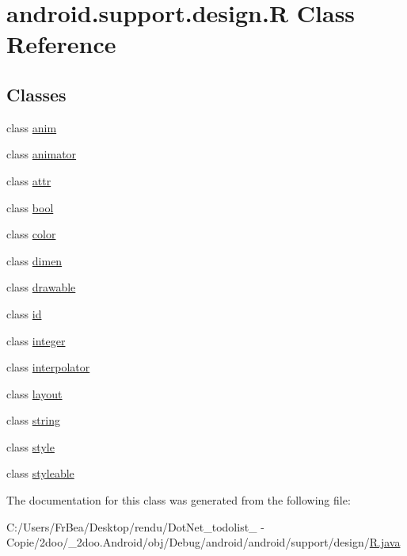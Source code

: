 \hypertarget{classandroid_1_1support_1_1design_1_1_r}{
\section{android.support.design.R Class Reference}
\label{classandroid_1_1support_1_1design_1_1_r}
}
\subsection*{Classes}
\begin{CompactItemize}
\item 
class \hyperlink{classandroid_1_1support_1_1design_1_1_r_1_1anim}{anim}
\item 
class \hyperlink{classandroid_1_1support_1_1design_1_1_r_1_1animator}{animator}
\item 
class \hyperlink{classandroid_1_1support_1_1design_1_1_r_1_1attr}{attr}
\item 
class \hyperlink{classandroid_1_1support_1_1design_1_1_r_1_1bool}{bool}
\item 
class \hyperlink{classandroid_1_1support_1_1design_1_1_r_1_1color}{color}
\item 
class \hyperlink{classandroid_1_1support_1_1design_1_1_r_1_1dimen}{dimen}
\item 
class \hyperlink{classandroid_1_1support_1_1design_1_1_r_1_1drawable}{drawable}
\item 
class \hyperlink{classandroid_1_1support_1_1design_1_1_r_1_1id}{id}
\item 
class \hyperlink{classandroid_1_1support_1_1design_1_1_r_1_1integer}{integer}
\item 
class \hyperlink{classandroid_1_1support_1_1design_1_1_r_1_1interpolator}{interpolator}
\item 
class \hyperlink{classandroid_1_1support_1_1design_1_1_r_1_1layout}{layout}
\item 
class \hyperlink{classandroid_1_1support_1_1design_1_1_r_1_1string}{string}
\item 
class \hyperlink{classandroid_1_1support_1_1design_1_1_r_1_1style}{style}
\item 
class \hyperlink{classandroid_1_1support_1_1design_1_1_r_1_1styleable}{styleable}
\end{CompactItemize}


The documentation for this class was generated from the following file:\begin{CompactItemize}
\item 
C:/Users/FrBea/Desktop/rendu/DotNet\_\-todolist\_ - Copie/2doo/\_\-2doo.Android/obj/Debug/android/android/support/design/\hyperlink{android_2support_2design_2_r_8java}{R.java}\end{CompactItemize}
